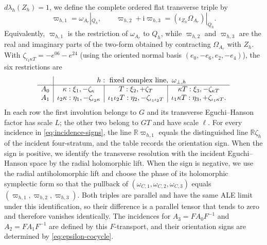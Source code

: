 \documentclass[11pt]{article}
\theoremstyle{remark}\newtheorem{remark}[theorem]{Remark}
\newcommand{\ii}{\mathrm i}
\newcommand{\R}{\mathbb R}
\begin{document}
$d\lambda_h(Z_h)=1$, we define the complete ordered flat transverse triple
by
\begin{equation}\label{eq:incidence-triple}
 \varpi_{h,1}=\omega_{A_r}|_{Q_h},\qquad
 \varpi_{h,2}+\ii\varpi_{h,3}
   =(\iota_{Z_h}\Omega_{A_r})|_{Q_h}.
\end{equation}
Equivalently, $\varpi_{h,1}$ is the restriction of $\omega_{A_r}$ to
$Q_h$, while $\varpi_{h,2}$ and $\varpi_{h,3}$ are the real and imaginary
parts of the two-form obtained by contracting $\Omega_{A_r}$ with $Z_h$.
With
$\zeta_{\iota_1\kappa T}=-e^{06}-e^{24}$ (using the oriented normal basis
$(e_0,-e_6,e_2,-e_4)$), the six restrictions are
\begin{equation}\label{eq:incidence-signs}
\begin{array}{c|c|c|c}
 &\multicolumn{3}{c}{h:\ \text{fixed complex line},\ \omega_{\perp,h}}\\
\hline
A_0&\kappa:\xi_1,-\zeta_\kappa&T:\xi_2,+\zeta_T&
\kappa T:\xi_3,-\zeta_{\kappa T}\\
A_1&\iota_2\kappa:\eta_1,-\zeta_{\iota_2\kappa}&
\iota_1\iota_2T:\eta_2,-\zeta_{\iota_1\iota_2T}&
\iota_1\kappa T:\eta_3,+\zeta_{\iota_1\kappa T}.
\end{array}
\end{equation}
In each row the first involution belongs to $G$ and its transverse
Eguchi--Hanson factor has scale $L$; the other two belong to $GT$ and have
scale $\ell$.  For every incidence in \eqref{eq:incidence-signs}, the line
$\R\varpi_{h,1}$ equals the distinguished line $\R\zeta_h$ of the incident
four-stratum, and the table records the orientation sign.  When the sign
is positive, we identify the transverse resolution with the incident
Eguchi--Hanson space by the radial holomorphic lift.  When the sign is
negative, we use the radial antiholomorphic lift and choose the phase of
its holomorphic symplectic form so that the pullback of
$(\omega_{C,1},\omega_{C,2},\omega_{C,3})$ equals
$(\varpi_{h,1},\varpi_{h,2},\varpi_{h,3})$.  Both triples are parallel and
have the same ALE limit under this identification, so their difference is
a parallel tensor that tends to zero and therefore vanishes identically.
The incidences for $A_3=FA_0F^{-1}$ and $A_2=FA_1F^{-1}$ are defined by
this $F$-transport, and their orientation signs are determined by
\eqref{eq:epsilon-cocycle}.
\end{document}
